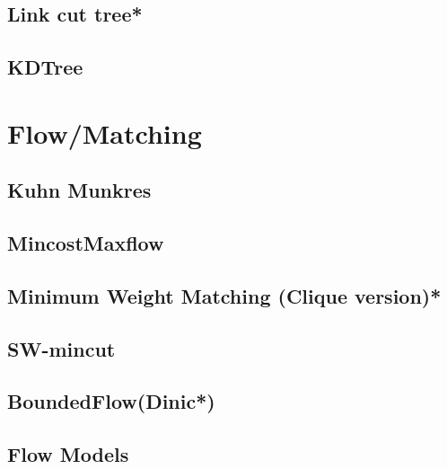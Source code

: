 \subsection{Link cut tree*} %

\subsection{KDTree}



\section{Flow/Matching}
% 
\subsection{Kuhn Munkres}

\subsection{MincostMaxflow}

%
\subsection{Minimum Weight Matching (Clique version)*} %

\subsection{SW-mincut}

\subsection{BoundedFlow(Dinic*)} %

\subsection{Flow Models}

% 


